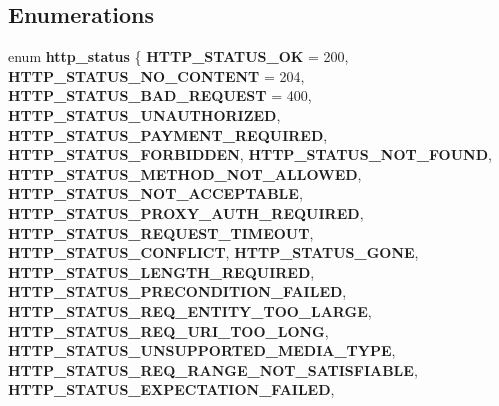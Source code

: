 \subsection*{Enumerations}
\begin{DoxyCompactItemize}
\item 
\mbox{\label{group__http_gabc3b93f68c8bdd857ad32913628dfa8d}} 
enum {\bfseries http\+\_\+status} \{ \newline
{\bfseries H\+T\+T\+P\+\_\+\+S\+T\+A\+T\+U\+S\+\_\+\+OK} = 200, 
{\bfseries H\+T\+T\+P\+\_\+\+S\+T\+A\+T\+U\+S\+\_\+\+N\+O\+\_\+\+C\+O\+N\+T\+E\+NT} = 204, 
{\bfseries H\+T\+T\+P\+\_\+\+S\+T\+A\+T\+U\+S\+\_\+\+B\+A\+D\+\_\+\+R\+E\+Q\+U\+E\+ST} = 400, 
{\bfseries H\+T\+T\+P\+\_\+\+S\+T\+A\+T\+U\+S\+\_\+\+U\+N\+A\+U\+T\+H\+O\+R\+I\+Z\+ED}, 
\newline
{\bfseries H\+T\+T\+P\+\_\+\+S\+T\+A\+T\+U\+S\+\_\+\+P\+A\+Y\+M\+E\+N\+T\+\_\+\+R\+E\+Q\+U\+I\+R\+ED}, 
{\bfseries H\+T\+T\+P\+\_\+\+S\+T\+A\+T\+U\+S\+\_\+\+F\+O\+R\+B\+I\+D\+D\+EN}, 
{\bfseries H\+T\+T\+P\+\_\+\+S\+T\+A\+T\+U\+S\+\_\+\+N\+O\+T\+\_\+\+F\+O\+U\+ND}, 
{\bfseries H\+T\+T\+P\+\_\+\+S\+T\+A\+T\+U\+S\+\_\+\+M\+E\+T\+H\+O\+D\+\_\+\+N\+O\+T\+\_\+\+A\+L\+L\+O\+W\+ED}, 
\newline
{\bfseries H\+T\+T\+P\+\_\+\+S\+T\+A\+T\+U\+S\+\_\+\+N\+O\+T\+\_\+\+A\+C\+C\+E\+P\+T\+A\+B\+LE}, 
{\bfseries H\+T\+T\+P\+\_\+\+S\+T\+A\+T\+U\+S\+\_\+\+P\+R\+O\+X\+Y\+\_\+\+A\+U\+T\+H\+\_\+\+R\+E\+Q\+U\+I\+R\+ED}, 
{\bfseries H\+T\+T\+P\+\_\+\+S\+T\+A\+T\+U\+S\+\_\+\+R\+E\+Q\+U\+E\+S\+T\+\_\+\+T\+I\+M\+E\+O\+UT}, 
{\bfseries H\+T\+T\+P\+\_\+\+S\+T\+A\+T\+U\+S\+\_\+\+C\+O\+N\+F\+L\+I\+CT}, 
\newline
{\bfseries H\+T\+T\+P\+\_\+\+S\+T\+A\+T\+U\+S\+\_\+\+G\+O\+NE}, 
{\bfseries H\+T\+T\+P\+\_\+\+S\+T\+A\+T\+U\+S\+\_\+\+L\+E\+N\+G\+T\+H\+\_\+\+R\+E\+Q\+U\+I\+R\+ED}, 
{\bfseries H\+T\+T\+P\+\_\+\+S\+T\+A\+T\+U\+S\+\_\+\+P\+R\+E\+C\+O\+N\+D\+I\+T\+I\+O\+N\+\_\+\+F\+A\+I\+L\+ED}, 
{\bfseries H\+T\+T\+P\+\_\+\+S\+T\+A\+T\+U\+S\+\_\+\+R\+E\+Q\+\_\+\+E\+N\+T\+I\+T\+Y\+\_\+\+T\+O\+O\+\_\+\+L\+A\+R\+GE}, 
\newline
{\bfseries H\+T\+T\+P\+\_\+\+S\+T\+A\+T\+U\+S\+\_\+\+R\+E\+Q\+\_\+\+U\+R\+I\+\_\+\+T\+O\+O\+\_\+\+L\+O\+NG}, 
{\bfseries H\+T\+T\+P\+\_\+\+S\+T\+A\+T\+U\+S\+\_\+\+U\+N\+S\+U\+P\+P\+O\+R\+T\+E\+D\+\_\+\+M\+E\+D\+I\+A\+\_\+\+T\+Y\+PE}, 
{\bfseries H\+T\+T\+P\+\_\+\+S\+T\+A\+T\+U\+S\+\_\+\+R\+E\+Q\+\_\+\+R\+A\+N\+G\+E\+\_\+\+N\+O\+T\+\_\+\+S\+A\+T\+I\+S\+F\+I\+A\+B\+LE}, 
{\bfseries H\+T\+T\+P\+\_\+\+S\+T\+A\+T\+U\+S\+\_\+\+E\+X\+P\+E\+C\+T\+A\+T\+I\+O\+N\+\_\+\+F\+A\+I\+L\+ED}, 

\end{DoxyCompactItemize}
